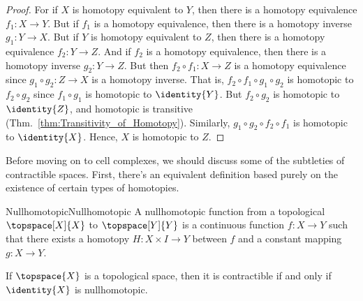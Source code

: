 \documentclass{book}                                                           %
\begin{document}
                \begin{proof}
                    For if $X$ is homotopy equivalent to $Y$, then there is a
                    homotopy equivalence $f_{1}:X\rightarrow{Y}$. But if $f_{1}$
                    is a homotopy equivalence, then there is a homotopy inverse
                    $g_{1}:Y\rightarrow{X}$. But if $Y$ is homotopy equivalent
                    to $Z$, then there is a homotopy equivalence
                    $f_{2}:Y\rightarrow{Z}$. And if $f_{2}$ is a homotopy
                    equivalence, then there is a homotopy inverse
                    $g_{2}:Y\rightarrow{Z}$. But then
                    $f_{2}\circ{f}_{1}:X\rightarrow{Z}$ is a homotopy
                    equivalence since $g_{1}\circ{g}_{2}:Z\rightarrow{X}$ is a
                    homotopy inverse. That is,
                    $f_{2}\circ{f}_{1}\circ{g}_{1}\circ{g}_{2}$ is homotopic to
                    $f_{2}\circ{g}_{2}$ since $f_{1}\circ{g}_{1}$ is homotopic
                    to $\identity{Y}$. But $f_{2}\circ{g}_{2}$ is homotopic to
                    $\identity{Z}$, and homotopic is transitive
                    (Thm.~\ref{thm:Transitivity_of_Homotopy}). Similarly,
                    $g_{1}\circ{g}_{2}\circ{f}_{2}\circ{f}_{1}$ is homotopic to
                    $\identity{X}$. Hence, $X$ is homotopic to $Z$.
                \end{proof}
                Before moving on to cell complexes, we should discuss some of
                the subtleties of contractible spaces. First, there's an
                equivalent definition based purely on the existence of certain
                types of homotopies.
                \begin{fdefinition}{Nullhomotopic}{Nullhomotopic}
                    A nullhomotopic function from a topological
                    $\topspace[X]{X}$ to $\topspace[Y]{Y}$ is a continuous
                    function $f:X\rightarrow{Y}$ such that there exists a
                    homotopy $H:X\times{I}\rightarrow{Y}$ between $f$ and a
                    constant mapping $g:X\rightarrow{Y}$.
                \end{fdefinition}
                \begin{theorem}
                    If $\topspace{X}$ is a topological space, then it is
                    contractible if and only if $\identity{X}$ is nullhomotopic.
                \end{theorem}
\end{document}
